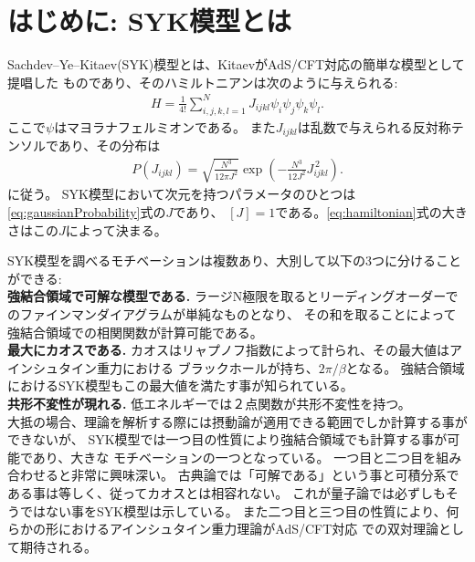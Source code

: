 \section{はじめに: SYK模型とは}
Sachdev--Ye--Kitaev(SYK)模型とは、KitaevがAdS/CFT対応の簡単な模型として提唱した
ものであり、そのハミルトニアンは次のように与えられる:
\begin{align}
  H = \frac{1}{4!}\sum_{i,j,k,l = 1}^{N} J_{ijkl}\psi_i\psi_j\psi_k\psi_l.
  \label{eq:hamiltonian}
\end{align}
ここで$\psi$はマヨラナフェルミオンである。
また$J_{ijkl}$は乱数で与えられる反対称テンソルであり、その分布は
\begin{align}
  P(J_{ijkl}) = \sqrt{\frac{N^3}{12\pi J^2}}
                \exp\left(-\frac{N^3}{12J^2}J_{ijkl}^{\, 2}\right).
	\label{eq:gaussianProbability}
\end{align}
に従う。
SYK模型において次元を持つパラメータのひとつは\eqref{eq:gaussianProbability}式の$J$であり、
$[J] = 1$である。\eqref{eq:hamiltonian}式の大きさはこの$J$によって決まる。

SYK模型を調べるモチベーションは複数あり、大別して以下の3つに分けることができる:\\

\textbf{強結合領域で可解な模型である.}
ラージN極限を取るとリーディングオーダーでのファインマンダイアグラムが単純なものとなり、
その和を取ることによって強結合領域での相関関数が計算可能である。\\

\textbf{最大にカオスである.}
カオスはリャプノフ指数によって計られ、その最大値はアインシュタイン重力における
ブラックホールが持ち、$2\pi / \beta$となる\cite{shenker}。
強結合領域におけるSYK模型もこの最大値を満たす事が知られている\cite{maldacena}。\\

\textbf{共形不変性が現れる.}
低エネルギーでは２点関数が共形不変性を持つ。\\

大抵の場合、理論を解析する際には摂動論が適用できる範囲でしか計算する事ができないが、
SYK模型では一つ目の性質により強結合領域でも計算する事が可能であり、大きな
モチベーションの一つとなっている。
一つ目と二つ目を組み合わせると非常に興味深い。
古典論では「可解である」という事と可積分系である事は等しく、従ってカオスとは相容れない\cite{polchinski}。
これが量子論では必ずしもそうではない事をSYK模型は示している。
また二つ目と三つ目の性質により、何らかの形におけるアインシュタイン重力理論がAdS/CFT対応
での双対理論として期待される。

